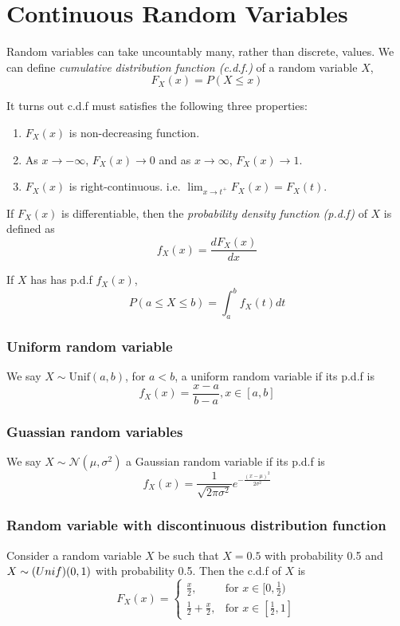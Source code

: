 \section{Continuous Random Variables}
Random variables can take uncountably many, rather than discrete, values. We can define \textit{cumulative distribution function (c.d.f.)} of a random variable $X$,
$$F_X(x) = P(X \leq x)$$

It turns out c.d.f must satisfies the following three properties:
\begin{enumerate}
	\item $F_X(x)$ is non-decreasing function.
	\item As $x\to -\infty$, $F_X(x) \to 0$ and as $x \to \infty$, $F_X(x) \to 1$.
	\item $F_X(x)$ is right-continuous. i.e. $\lim_{x\to t^+} F_X(x) = F_X(t)$.
\end{enumerate}

If $F_X(x)$ is differentiable, then the \textit{probability density function (p.d.f)} of $X$ is defined as
$$f_X(x) = \frac{dF_X(x)}{dx}$$

If $X$ has has p.d.f $f_X(x)$,
$$P(a\leq X \leq b) = \int_a^b f_X(t) dt$$

\subsubsection{Uniform random variable}
We say $X\sim \textrm{Unif} (a,b)$, for $a<b$, a uniform random variable if its p.d.f is
$$f_X(x) = \frac{x-a}{b-a}, x \in [a,b]$$

\subsubsection{Guassian random variables}
We say $X\sim \mathcal{N}(\mu, \sigma^2)$ a Gaussian random variable if its p.d.f is
$$f_X(x) = \frac{1}{\sqrt{2\pi \sigma^2}} e^{-\frac{(x-\mu)^2}{2\sigma^2}}$$

\subsubsection{Random variable with discontinuous distribution function}
Consider a random variable $X$ be such that $X=0.5$ with probability 0.5 and $X\sim \textrm(Unif)(0,1)$ with probability 0.5. Then the c.d.f of $X$ is
$$F_X(x) =  \begin{cases}
	\frac{x}{2}, & \textrm{for $x\in [0, \frac{1}{2})$} \\
	\frac{1}{2} + \frac{x}{2}, & \textrm{for $x\in [\frac{1}{2}, 1]$}
	\end{cases}
$$


